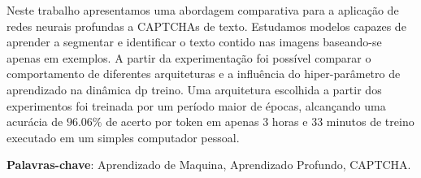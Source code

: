 \setlength{\absparsep}{18pt} %
\begin{resumo}
 
Neste trabalho apresentamos uma abordagem comparativa para a aplicação de redes neurais profundas a CAPTCHAs de texto. Estudamos modelos capazes de aprender a segmentar e identificar o texto contido nas imagens baseando-se apenas em exemplos. A partir da experimentação foi possível comparar o comportamento de diferentes arquiteturas e a influência do hiper-parâmetro de aprendizado na dinâmica dp treino. Uma arquitetura escolhida a partir dos experimentos foi treinada por um período maior de épocas, alcançando uma acurácia de $96.06\%$ de acerto por token em apenas 3 horas e 33 minutos de treino executado em um simples computador pessoal.

\vspace{\onelineskip}

\noindent
\textbf{Palavras-chave}: Aprendizado de Maquina, Aprendizado Profundo, CAPTCHA.
\end{resumo}

